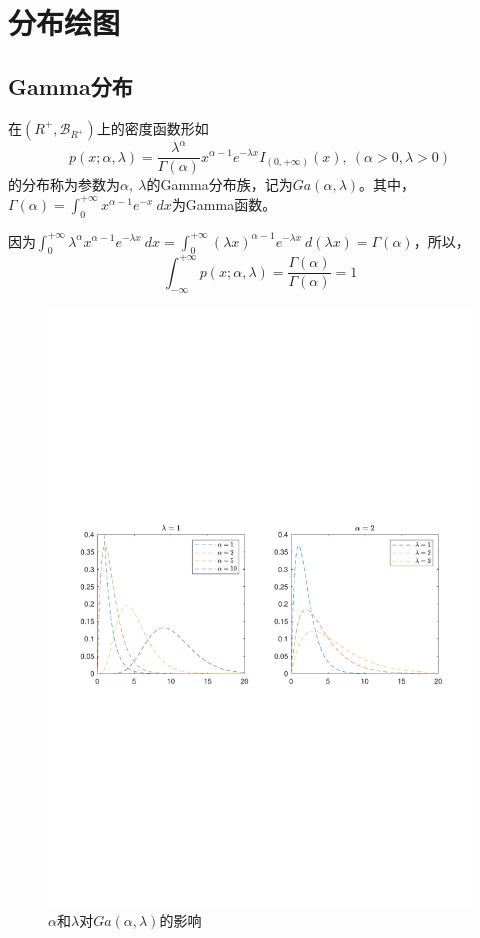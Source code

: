 \section{分布绘图}
\subsection{Gamma分布}
\begin{newdef}[Gamma分布族]
    在$(R^+, \mathscr{B}_{R^+})$上的密度函数形如
    \[
        p(x;\alpha, \lambda) = \dfrac{\lambda^\alpha}{\Gamma(\alpha)}x^{\alpha-1}e^{-\lambda x}I_{(0,+\infty)}(x),\ (\alpha>0, \lambda>0)  
    \]
    的分布称为参数为$\alpha,\ \lambda$的\textcolor{main1}{Gamma分布族}，记为$Ga(\alpha, \lambda)$。其中，$\Gamma(\alpha) = \int_{0}^{+\infty}x^{\alpha-1}e^{-x}\ dx$为Gamma函数。
\end{newdef}

\begin{note}
    因为$\int_{0}^{+\infty}\lambda^\alpha x^{\alpha-1}e^{-\lambda x}\ dx= \int_{0}^{+\infty} (\lambda x)^{\alpha-1}e^{-\lambda x}\ d(\lambda x) = \Gamma(\alpha)$，所以，
    \[
        \int_{-\infty}^{+\infty} p(x;\alpha, \lambda) = \dfrac{\Gamma(\alpha)}{\Gamma(\alpha)} = 1
    \]
\end{note}

\begin{figure}[htbp]
    \centering
    \includegraphics[width =\textwidth]{image/gamma.pdf}
    \caption{$\alpha$和$\lambda$对$Ga(\alpha, \lambda)$的影响}
    \label{fig:gamma}
\end{figure}

